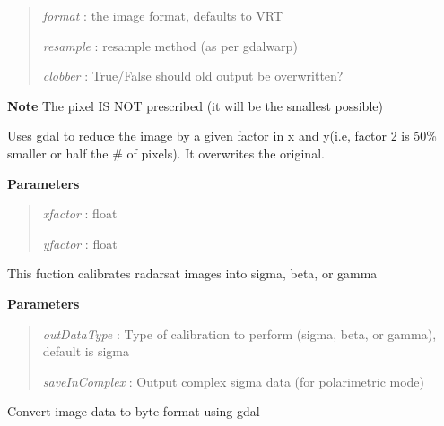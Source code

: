 \documentclass[letterpaper,10pt,openany,oneside]{sphinxmanual}
\begin{document}
\begin{fulllineitems}
\begin{fulllineitems}
\begin{quote}
\emph{format}   : the image format, defaults to VRT

\emph{resample} : resample method (as per gdalwarp)

\emph{clobber}  : True/False should old output be overwritten?
\end{quote}

\textbf{Note} The pixel IS NOT prescribed (it will be the smallest possible)

\end{fulllineitems}


\begin{fulllineitems}
\label{code:Image.Image.reduceImg}
Uses gdal to reduce the image by a given factor in x and y(i.e, factor 2 is 50\%
smaller or half the \# of pixels). It overwrites the original.

\textbf{Parameters}
\begin{quote}

\emph{xfactor} : float

\emph{yfactor} : float
\end{quote}

\end{fulllineitems}


\begin{fulllineitems}
\label{code:Image.Image.snapCalibration}
This fuction calibrates radarsat images into sigma, beta, or gamma

\textbf{Parameters}
\begin{quote}

\emph{outDataType} : Type of calibration to perform (sigma, beta, or gamma), default is sigma

\emph{saveInComplex} : Output complex sigma data (for polarimetric mode)
\end{quote}

\end{fulllineitems}


\begin{fulllineitems}
\label{code:Image.Image.snapDataTypeConv}
Convert image data to byte format using gdal


\end{fulllineitems}
\end{fulllineitems}
\end{document}
